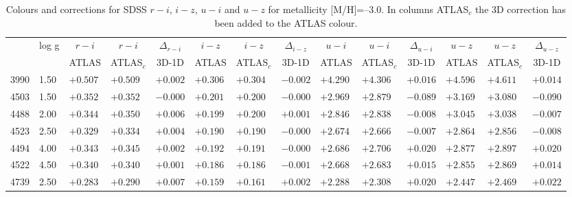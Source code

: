 \documentclass[]{aa}
\def\teff{$T\rm_{eff}$}
\begin{document}
\begin{appendix}
\begin{table*}
\caption{\label{SDSS_2_m30}
Colours and corrections for  SDSS $r-i$, $i-z$, $u-i$ and $u-z$ for metallicity [M/H]=--3.0. In columns ATLAS$_c$ the 3D correction
has been added to the ATLAS colour.  }
\renewcommand{\tabcolsep}{3pt}
\tabskip=0pt
\begin{center}
\begin{tabular}{llllllllllllll}
\hline\noalign{\smallskip}
\multicolumn{1}{c}{\teff} & 
\multicolumn{1}{c}{log g} & 
\multicolumn{1}{c}{$r-i$} &
\multicolumn{1}{c}{$r-i$} &
\multicolumn{1}{c}{$\Delta_{r-i}$} &
\multicolumn{1}{c}{$i-z$} &
\multicolumn{1}{c}{$i-z$} &
\multicolumn{1}{c}{$\Delta_{i-z}$} &
\multicolumn{1}{c}{$u-i$} &
\multicolumn{1}{c}{$u-i$} &
\multicolumn{1}{c}{$\Delta_{u-i}$} & 
\multicolumn{1}{c}{$u-z$} &
\multicolumn{1}{c}{$u-z$} &
\multicolumn{1}{c}{$\Delta_{u-z}$} \\
\multicolumn{2}{c}{ } &  
\multicolumn{1}{c}{ATLAS} &
\multicolumn{1}{c}{ATLAS$_c$}&
\multicolumn{1}{c}{3D-1D}&
\multicolumn{1}{c}{ATLAS} &
\multicolumn{1}{c}{ATLAS$_c$}&
\multicolumn{1}{c}{3D-1D}&
\multicolumn{1}{c}{ATLAS} &
\multicolumn{1}{c}{ATLAS$_c$}&
\multicolumn{1}{c}{3D-1D}&
\multicolumn{1}{c}{ATLAS} &
\multicolumn{1}{c}{ATLAS$_c$}&
\multicolumn{1}{c}{3D-1D} \\
\hline\noalign{\smallskip}
\hline\noalign{\smallskip}
3990  &1.50 & $+0.507$ & $+0.509$ & $+0.002$ & $+0.306$ & $+0.304$ & $-0.002$ & $+4.290$ & $+4.306$ & $+0.016$ & $+4.596$ & $+4.611$ & $+0.014$ \\
4503  &1.50 & $+0.352$ & $+0.352$ & $-0.000$ & $+0.201$ & $+0.200$ & $-0.000$ & $+2.969$ & $+2.879$ & $-0.089$ & $+3.169$ & $+3.080$ & $-0.090$ \\
4488  &2.00 & $+0.344$ & $+0.350$ & $+0.006$ & $+0.199$ & $+0.200$ & $+0.001$ & $+2.846$ & $+2.838$ & $-0.008$ & $+3.045$ & $+3.038$ & $-0.007$ \\
4523  &2.50 & $+0.329$ & $+0.334$ & $+0.004$ & $+0.190$ & $+0.190$ & $-0.000$ & $+2.674$ & $+2.666$ & $-0.007$ & $+2.864$ & $+2.856$ & $-0.008$ \\
4494  &4.00 & $+0.343$ & $+0.345$ & $+0.002$ & $+0.192$ & $+0.191$ & $-0.000$ & $+2.686$ & $+2.706$ & $+0.020$ & $+2.877$ & $+2.897$ & $+0.020$ \\
4522  &4.50 & $+0.340$ & $+0.340$ & $+0.001$ & $+0.186$ & $+0.186$ & $-0.001$ & $+2.668$ & $+2.683$ & $+0.015$ & $+2.855$ & $+2.869$ & $+0.014$ \\
4739  &2.50 & $+0.283$ & $+0.290$ & $+0.007$ & $+0.159$ & $+0.161$ & $+0.002$ & $+2.288$ & $+2.308$ & $+0.020$ & $+2.447$ & $+2.469$ & $+0.022$ \\

\end{tabular}
\end{center}
\end{table*}
\end{appendix}
\end{document}
